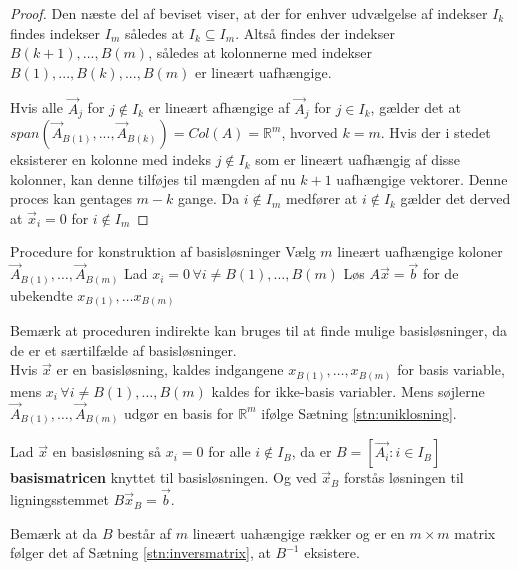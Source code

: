 \begin{proof}
Den næste del af beviset viser, at der for enhver udvælgelse af indekser $I_k$ findes indekser $I_m$ således at $I_k \subseteq I_m$. 
Altså findes der indekser $B(k+1),...,B(m)$, således at kolonnerne med indekser $B(1),...,B(k),...,B(m)$ er lineært uafhængige. 

Hvis alle $\vec{A}_j$ for $j \notin I_k$ er lineært afhængige af $\vec{A}_j$ for $j \in I_k$, gælder det at $span\left( \vec{A}_{B(1)},...,\vec{A}_{B(k)} \right)=Col(A)=\mathds{R}^m$, hvorved $k=m$. 
Hvis der i stedet eksisterer en kolonne med indeks $j \notin I_k$ som er lineært uafhængig af disse kolonner, kan denne tilføjes til mængden af nu $k+1$ uafhængige vektorer. Denne proces kan gentages $m-k$ gange. Da $i \notin I_m$ medfører at $i \notin I_k$ gælder det derved at $\vec{x}_i =0$ for $i \notin I_m$
\end{proof}

\begin{pro}{Procedure for konstruktion af basisløsninger}
Vælg $m$ lineært uafhængige koloner $\vec{A}_{B(1)},\dots,\vec{A}_{B(m)}$
Lad $x_i=0 \,\forall i\neq B(1),\dots,B(m)$
Løs $A\vec{x}=\vec{b}$ for de ubekendte $x_{B(1)},\dots x_{B(m)}$
\end{pro}
Bemærk at proceduren indirekte kan bruges til at finde mulige basisløsninger, da de er et særtilfælde af basisløsninger.\\

Hvis $\vec{x}$ er en basisløsning, kaldes indgangene $x_{B(1)},\dots ,x_{B(m)}$ for basis variable, mens $x_i \,\forall i\neq B(1),\dots,B(m)$ kaldes for ikke-basis variabler. Mens søjlerne $\vec{A}_{B(1)},\dots,\vec{A}_{B(m)}$ udgør en basis for $\mathds{R}^m$ ifølge Sætning \ref{stn:uniklosning}.
\begin{defn}
Lad $\vec{x}$ en basisløsning så $x_i = 0$ for alle $i \notin I_B$, da er $B = [\vec{A_i}: i \in I_B]$ \textbf{basismatricen} knyttet til basisløsningen. 
Og ved $\vec{x}_B$ forstås løsningen til ligningsstemmet $B\vec{x}_B =\vec{b}$.
\end{defn}
Bemærk at da $B$ består af $m$ lineært uahængige rækker og er en $m\times m$ matrix følger det af Sætning \ref{stn:inversmatrix}, at $B^{-1}$ eksistere. 


